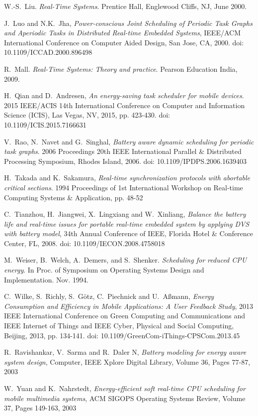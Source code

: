 \documentclass[10pt,article]{IEEEtran}
\begin{document}
\begin{thebibliography}{1}
W.-S.~Liu. \emph{Real-Time Systems}. Prentice Hall, Englewood Cliffs, NJ, June 2000.

J.~Luo and N.K.~Jha, \emph{Power-conscious Joint Scheduling of Periodic Task Graphs and Aperiodic Tasks in Distributed Real-time Embedded Systems}, IEEE/ACM International Conference on Computer Aided Design, San Jose, CA, 2000. doi: 10.1109/ICCAD.2000.896498

R.~Mall. \emph{Real-Time Systems: Theory and practice}. Pearson Education India, 2009.

H.~Qian and D.~Andresen, \emph{An energy-saving task scheduler for mobile devices}. 2015 IEEE/ACIS 14th International Conference on Computer and Information Science (ICIS), Las Vegas, NV, 2015, pp. 423-430.
doi: 10.1109/ICIS.2015.7166631

V.~Rao, N.~Navet and G.~Singhal, \emph{Battery aware dynamic scheduling for periodic task graphs}. 2006 Proceedings 20th IEEE International Parallel \& Distributed Processing Symposium, Rhodes Island, 2006. doi: 10.1109/IPDPS.2006.1639403  

H.~Takada and K.~Sakamura, \emph{Real-time synchronization protocols with abortable critical sections}. 1994 Proceedings of 1st International Workshop on Real-time Computing Systems \& Application, pp. 48-52

C.~Tianzhou, H.~Jiangwei, X.~Lingxiang and W.~Xinliang, \emph{Balance the battery life and real-time issues for portable real-time embedded system by applying DVS with battery model}, 34th Annual Conference of IEEE, Florida Hotel \& Conference Center, FL, 2008. doi: 10.1109/IECON.2008.4758018

M.~Weiser, B.~Welch, A.~Demers, and S.~Shenker. \emph{Scheduling for reduced CPU energy}. In Proc. of Symposium on Operating Systems Design and Implementation. Nov. 1994.
    
C.~Wilke, S.~Richly, S.~Götz, C.~Piechnick and U.~Aßmann, \emph{Energy Consumption and Efficiency in Mobile Applications: A User Feedback Study}, 2013 IEEE International Conference on Green Computing and Communications and IEEE Internet of Things and IEEE Cyber, Physical and Social Computing, Beijing, 2013, pp. 134-141.
doi: 10.1109/GreenCom-iThings-CPSCom.2013.45

R.~Ravishankar, V.~Sarma and R.~Daler N, \emph{Battery modeling for energy aware system design},  Computer, IEEE Xplore Digital Library, Volume 36, Pages 77-87, 2003

W.~Yuan and K.~Nahrstedt, \emph{Energy-efficient soft real-time CPU scheduling for mobile multimedia systems},  ACM SIGOPS Operating Systems Review, Volume 37, Pages 149-163, 2003

\end{thebibliography}
\end{document}
